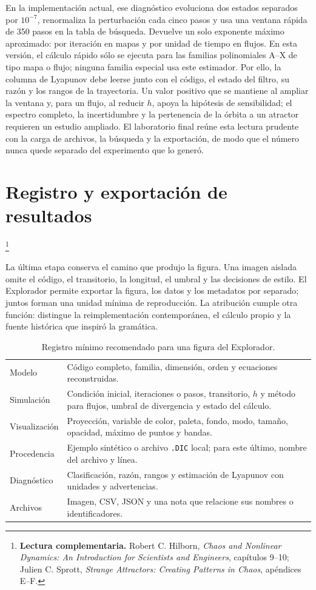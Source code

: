 \documentclass[11pt]{article}
\newcommand{\codigo}[1]{\texttt{#1}}
\newcommand{\lecturasprott}[1]{%
  \par\noindent{\sffamily\scriptsize\color{Teal}Lectura complementaria}\footnote{%
  \textbf{Lectura complementaria.} #1}\par}
\begin{document}
En la implementación actual, ese diagnóstico evoluciona dos estados separados por
\(10^{-7}\), renormaliza la perturbación cada cinco pasos y usa una ventana rápida de
350 pasos en la tabla de búsqueda. Devuelve un solo exponente máximo aproximado: por
iteración en mapas y por unidad de tiempo en flujos. En esta versión, el cálculo rápido
sólo se ejecuta para las familias polinomiales A--X de tipo mapa o flujo; ninguna familia
especial usa este estimador. Por ello, la columna de Lyapunov debe leerse junto con el
código, el estado del filtro, su razón y los rangos de la trayectoria. Un valor positivo
que se mantiene al ampliar la ventana y, para un flujo, al reducir \(h\), apoya la
hipótesis de sensibilidad; el espectro completo, la incertidumbre y la pertenencia de la
órbita a un atractor requieren un estudio ampliado. El laboratorio
final reúne esta lectura prudente con la carga de archivos, la búsqueda y la exportación,
de modo que el número nunca quede separado del experimento que lo generó.

\section{Registro y exportación de resultados}
\lecturasprott{Robert C. Hilborn, \emph{Chaos and Nonlinear Dynamics: An Introduction for Scientists and Engineers}, capítulos 9--10; Julien C. Sprott, \emph{Strange Attractors: Creating Patterns in Chaos}, apéndices E--F.}

La última etapa conserva el camino que produjo la figura.
Una imagen aislada omite el código, el transitorio, la longitud, el umbral y las
decisiones de estilo. El Explorador permite exportar la figura, los datos y los
metadatos por separado; juntos forman una unidad mínima de reproducción. La atribución
cumple otra función: distingue la reimplementación contemporánea, el cálculo propio y
la fuente histórica que inspiró la gramática.

\begin{table}[H]
\centering
\caption{Registro mínimo recomendado para una figura del Explorador.}
\small
\begin{tabularx}{\textwidth}{>{\sffamily\color{Teal}}p{}Y}
Modelo & Código completo, familia, dimensión, orden y ecuaciones reconstruidas.\\
Simulación & Condición inicial, iteraciones o pasos, transitorio, \(h\) y método para
flujos, umbral de divergencia y estado del cálculo.\\
Visualización & Proyección, variable de color, paleta, fondo, modo, tamaño, opacidad,
máximo de puntos y bandas.\\
Procedencia & Ejemplo sintético o archivo \codigo{.DIC} local; para este último, nombre
del archivo y línea.\\
Diagnóstico & Clasificación, razón, rangos y estimación de Lyapunov con unidades y
advertencias.\\
Archivos & Imagen, CSV, JSON y una nota que relacione sus nombres o identificadores.\\
\end{tabularx}
\end{table}
\end{document}
